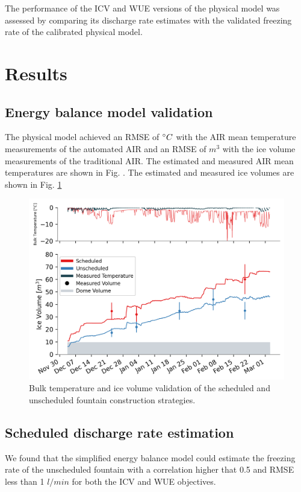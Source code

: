 \documentclass[tc, manuscript]{copernicus}
\begin{document}
The performance of the ICV and WUE versions of the physical model was assessed by comparing its discharge rate
estimates with the validated freezing rate of the calibrated physical model.

\section{Results}

\subsection{Energy balance model validation}
The physical model achieved an RMSE of $^{\circ} C$ with the AIR mean temperature measurements of the automated
AIR and an RMSE of $m^3$ with the ice volume measurements of the traditional AIR. The estimated and measured AIR
mean temperatures are shown in Fig. . The estimated and measured ice volumes are shown in Fig. \ref{fig:iceV}
 
\begin{figure}[t] 
  \includegraphics[width=12cm]{Figures/validation.png} 
  \caption{Bulk temperature and ice volume validation of the scheduled and unscheduled fountain construction strategies.} 
\label{fig:iceV} 
\end{figure}

\subsection{Scheduled discharge rate estimation}

We found that the simplified energy balance model could estimate the freezing rate of the unscheduled fountain with a
correlation higher that 0.5 and RMSE less than 1 $l/min$ for both the ICV and WUE objectives.
\end{document}
